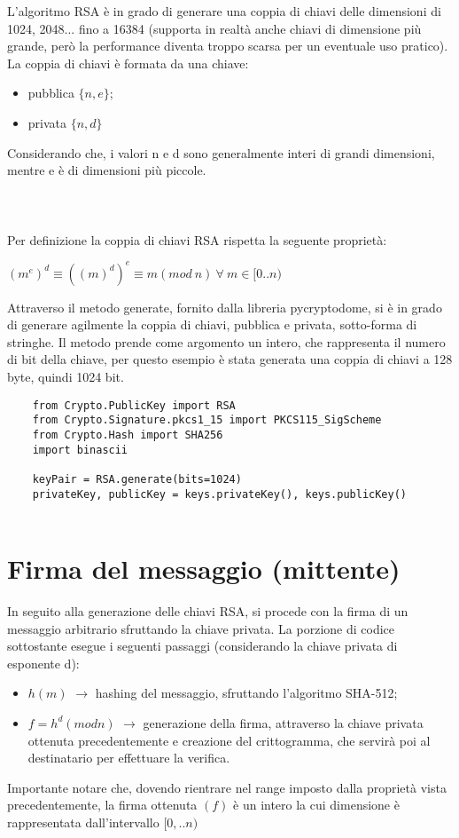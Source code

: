 L'algoritmo RSA è in grado di generare una coppia di chiavi delle dimensioni di 1024, 2048... fino a 16384 (supporta in realtà anche chiavi di dimensione più grande, però la performance diventa troppo scarsa per un eventuale uso pratico). La coppia di chiavi è formata da una chiave:
\begin{itemize}
	\item pubblica $\{n, e\}$;
	\item privata $\{n, d\}$
\end{itemize}
Considerando che, i valori n e d sono generalmente interi di grandi dimensioni, mentre e è di dimensioni più piccole. \\ \\ \\ \\
Per definizione la coppia di chiavi RSA rispetta la seguente proprietà: 
\begin{center}
	$(m^{e})^{d} \equiv ((m)^{d})^{e} \equiv m (mod \: n) \: \forall \: m \in [0..n)$
\end{center} 
Attraverso il metodo generate, fornito dalla libreria pycryptodome, si è in grado di generare agilmente la coppia di chiavi, pubblica e privata, sotto-forma di stringhe. Il metodo prende come argomento un intero, che rappresenta il numero di bit della chiave, per questo esempio è stata generata una coppia di chiavi a 128 byte, quindi 1024 bit.

\begin{lstlisting}
	from Crypto.PublicKey import RSA
	from Crypto.Signature.pkcs1_15 import PKCS115_SigScheme
	from Crypto.Hash import SHA256
	import binascii
	
	keyPair = RSA.generate(bits=1024)
	privateKey, publicKey = keys.privateKey(), keys.publicKey()
	
\end{lstlisting}

\section{Firma del messaggio (mittente)}

In seguito alla generazione delle chiavi RSA, si procede con la firma di un messaggio arbitrario sfruttando la chiave privata. La porzione di codice sottostante esegue i seguenti passaggi (considerando la chiave privata di esponente d):
\begin{itemize}
	\item $h(m)$ $\rightarrow$ hashing del messaggio, sfruttando l'algoritmo SHA-512;
	\item $f = h^d (mod n)$ $\rightarrow$ generazione della firma, attraverso la chiave privata ottenuta precedentemente e creazione del crittogramma, che servirà poi al destinatario per effettuare la verifica.
\end{itemize}
Importante notare che, dovendo rientrare nel range imposto dalla proprietà vista precedentemente, la firma ottenuta $(f)$ è un intero la cui dimensione è rappresentata dall'intervallo $[0,..n)$

